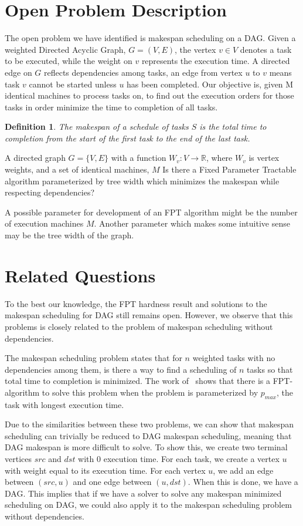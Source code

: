 \documentclass{article}
\newtheorem{definition}{Definition}
\begin{document}
\section{Open Problem Description}
The open problem we have identified is makespan scheduling on a DAG.
Given a weighted Directed Acyclic Graph, $G=(V,E)$, the vertex
$v \in V$ denotes a task to be executed, while the weight on $v$
represents the execution time. A directed edge on $G$ reflects
dependencies among tasks, an edge from vertex $u$ to $v$
means task $v$ cannot be started unless $u$ has been completed.
Our objective is, given M identical machines to process tasks on, to find out the execution
orders for those tasks in order minimize the time to completion of all tasks.


\begin{definition}
The \emph{makespan} of a schedule of tasks $S$ is the total time to completion
from the start of the first task to the end of the last task.
\end{definition}


%
{A directed graph $G = \{V, E\}$ with a function $W_v: V \to \mathbb{R}$,
 where $W_v$ is vertex weights, and a set of identical machines,
$M$}%
{}%
{Is there a Fixed Parameter Tractable algorithm parameterized by tree width
which  minimizes the makespan while respecting
dependencies?}%

A possible parameter for development of an FPT algorithm might be the number of
execution machines $M$. Another parameter which makes some intuitive sense may
be the tree width of the graph.

\section{Related Questions}
To the best our knowledge, the FPT hardness result and solutions to the
makespan scheduling for DAG still remains open.
However, we observe that this problems is closely related to the problem of
makespan scheduling without dependencies.

The makespan scheduling problem states that for $n$ weighted tasks with no
dependencies among them, is there a way to find a scheduling of $n$
tasks so that total time to completion is minimized. The work of~\cite{mnich2015scheduling}
shows that there is a FPT-algorithm to solve this problem
when the problem is parameterized by $p_{max}$, the task with longest
execution time.

Due to the similarities between these two problems, we can show that makespan
scheduling can trivially be reduced to DAG makespan scheduling, meaning
that DAG makespan is more difficult to solve. To show this,
we create two terminal vertices $src$ and $dst$ with 0 execution time. For each
task, we create a vertex $u$ with weight equal to its execution time. For each
vertex $u$, we add an edge between $(src,u)$ and one edge between $(u,dst)$.
When this is done, we have a DAG.
This implies that if we have a solver to solve any makespan minimized
scheduling on DAG, we could also apply it to the makespan scheduling problem
without dependencies.
\end{document}
